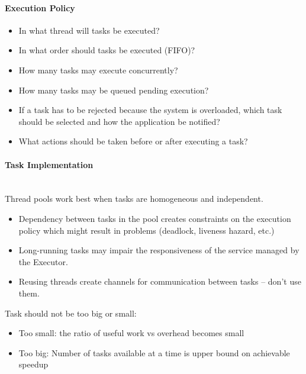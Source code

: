 \documentclass[a4paper]{article}
\begin{document}
\paragraph{Execution Policy}
\begin{itemize}
	\item In what thread will tasks be executed?
	\item In what order should tasks be executed (FIFO)?
	\item How many tasks may execute concurrently?
	\item How many tasks may be queued pending execution?
	\item If a task has to be rejected because the system is overloaded, which task should be selected and how the application be notified?
	\item What actions should be taken before or after executing a task?
\end{itemize}
\paragraph{Task Implementation}
\mbox{}\\
Thread pools work best when tasks are homogeneous and independent.
\begin{itemize}
	\item Dependency between tasks in the pool creates constraints on the execution policy which might result in problems (deadlock, liveness hazard, etc.)
	\item Long-running tasks may impair the responsiveness of the service managed by the Executor.
	\item Reusing threads create channels for communication between tasks – don’t use them.
\end{itemize}
Task should not be too big or small:
\begin{itemize}
	\item Too small: the ratio of useful work vs overhead becomes small
	\item Too big: Number of tasks available at a time is upper bound on achievable speedup
\end{itemize}
\end{document}

